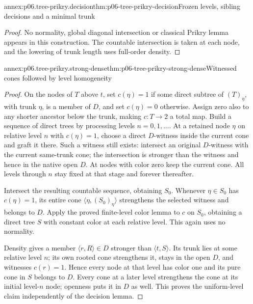 \begin{annexitem}{annex:p06.tree-prikry.decision}{thm:p06-tree-prikry-decision}{Frozen levels, sibling decisions and a minimal trunk}
\begin{proof}
No normality, global diagonal intersection or classical Prikry lemma
appears in this construction. The countable intersection is taken at
each node, and the lowering of trunk length uses full-order density.
\end{proof}
\end{annexitem}

\begin{annexitem}{annex:p06.tree-prikry.strong-dense}{thm:p06-tree-prikry-strong-dense}{Witnessed cones followed by level homogeneity}
\begin{proof}
On the nodes of \(T\) above \(t\), set \(c(\eta)=1\) if some
direct subtree of \((T)_\eta\), with trunk \(\eta\), is a member
of \(D\), and set \(c(\eta)=0\) otherwise. Assign zero also to any
shorter ancestor below the trunk, making \(c:T\to2\) a total map.
Build a sequence of
direct trees by processing levels \(n=0,1,\ldots\). At a retained
node \(\eta\) on relative level \(n\) with \(c(\eta)=1\), choose
a direct \(D\)-witness inside the current cone and graft it there.
Such a witness still exists: intersect an original \(D\)-witness
with the current same-trunk cone; the intersection is stronger than
the witness and hence in the native open \(D\). At nodes with color
zero keep the current cone. All levels through \(n\) stay fixed at
that stage and forever thereafter.

Intersect the resulting countable sequence, obtaining \(S_0\).
Whenever \(\eta\in S_0\) has \(c(\eta)=1\), its entire cone
\(\langle\eta,(S_0)_\eta\rangle\) strengthens the selected witness
and belongs to \(D\). Apply the proved finite-level color lemma to
\(c\) on \(S_0\), obtaining a direct tree \(S\) with constant
color at each relative level. This again uses no normality.

Density gives a member \(\langle r,R\rangle\in D\) stronger than
\(\langle t,S\rangle\). Its trunk lies at some relative level
\(n\); its own rooted cone strengthens it, stays in the open \(D\),
and witnesses \(c(r)=1\). Hence every node
at that level has color one and its pure cone in \(S\) belongs to
\(D\). Every cone at a later level strengthens the cone at its
initial level-\(n\) node; openness puts it in \(D\) as well.
This proves the uniform-level claim independently of the decision lemma.
\end{proof}
\end{annexitem}


